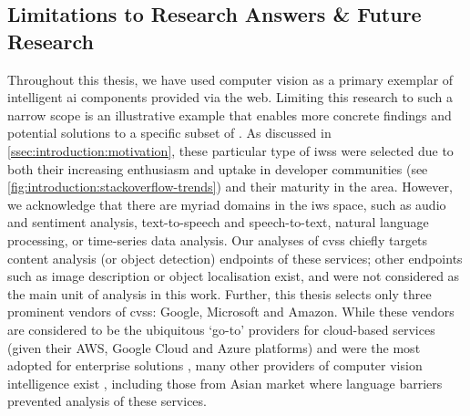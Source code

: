\subsection{Limitations to Research Answers \& Future Research}

Throughout this thesis, we have used computer vision as a primary exemplar of intelligent \gls{ai} components provided via the web. Limiting this research to such a narrow scope is an illustrative example that enables more concrete findings and potential solutions to a specific subset of . As discussed in \cref{ssec:introduction:motivation}, these particular type of \glspl{iws} were selected due to both their increasing enthusiasm and uptake in developer communities (see \cref{fig:introduction:stackoverflow-trends}) and their maturity in the area. However, we acknowledge that there are myriad domains in the \gls{iws} space, such as audio and sentiment analysis, text-to-speech and speech-to-text, natural language processing, or time-series data analysis. Our analyses of \glspl{cvs} chiefly targets content analysis (or object detection) endpoints of these services; other endpoints such as image description or object localisation exist, and were not considered as the main unit of analysis in this work. Further, this thesis selects only three prominent vendors of \glspl{cvs}: Google, Microsoft and Amazon. While these vendors are considered to be the ubiquitous `go-to' providers for cloud-based services (given their AWS, Google Cloud and Azure platforms) and were the most adopted for enterprise solutions \citep{RightScaleInc:2018kJ}, many other providers of computer vision intelligence exist , including those from Asian market  where language barriers prevented analysis of these services.

